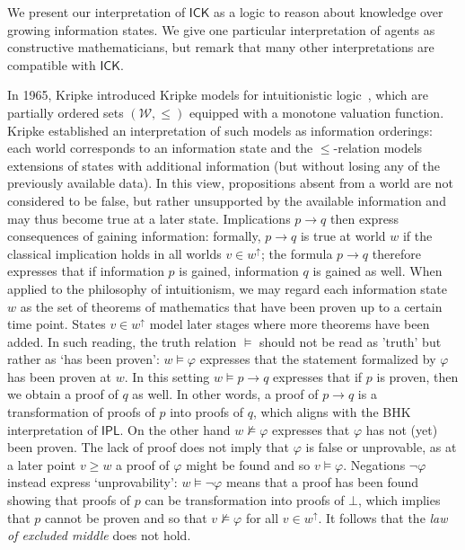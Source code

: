 \documentclass{myifcolog}
\newcommand{\ICK}{\mathsf{ICK}}
\newcommand{\W}{\mathcal{W}}
\numberwithin{theorem}{section}
\begin{document}
We present our interpretation of $\ICK$ as a logic to reason about knowledge over growing information states. We give one particular interpretation of agents as constructive mathematicians, but remark that many other interpretations are compatible with $\ICK$.

In 1965, Kripke introduced Kripke models for intuitionistic logic~\cite{Kripke_1965}, which are partially ordered sets $(\W, \leq)$ equipped with a monotone valuation function. Kripke established an interpretation of such models as information orderings: each world corresponds to an information state and the $\leq$-relation models extensions of states with additional information (but without losing any of the previously available data). In this view, propositions absent from a world are not considered to be false, but rather unsupported by the available information and may thus become true at a later state. Implications $p \rightarrow q$ then express consequences of gaining information: formally, $p \rightarrow q$ is true at world $w$ if the classical implication holds in all worlds $v \in w^\uparrow$; the formula $p \rightarrow q$ therefore expresses that if information $p$ is gained, information $q$  is gained as well. When applied to the philosophy of intuitionism, we may regard each information state $w$ as the set of theorems of mathematics that have been proven up to a certain time point. States $v \in w^\uparrow$ model later stages where more theorems have been added. In such reading, the truth relation $\models$ should not be read as 'truth' but rather as `has been proven': $w \models \varphi$ expresses that the statement formalized by $\varphi$ has been proven at $w$. In this setting $w \models p \to q$ expresses that if $p$ is proven, then we obtain a proof of $q$ as well. In other words, a proof of $p \to q$ is a transformation of proofs of $p$ into proofs of $q$, which aligns with the BHK interpretation of $\mathsf{IPL}$. On the other hand $w \not \models \varphi$ expresses that $\varphi$ has not (yet) been proven. The lack of proof does not imply that $\varphi$ is false or unprovable, as at a later point $v \geq w$ a proof of $\varphi$ might be found and so $v \models \varphi$. Negations $\neg \varphi$ instead express `unprovability': $w \models \neg \varphi$ means that a proof has been found showing that proofs of $p$ can be transformation into proofs of $\bot$, which implies that $p$ cannot be proven and so that $v \not \models \varphi$ for all $v \in w^\uparrow$. It follows that the \emph{law of excluded middle} does not hold.
\end{document}
